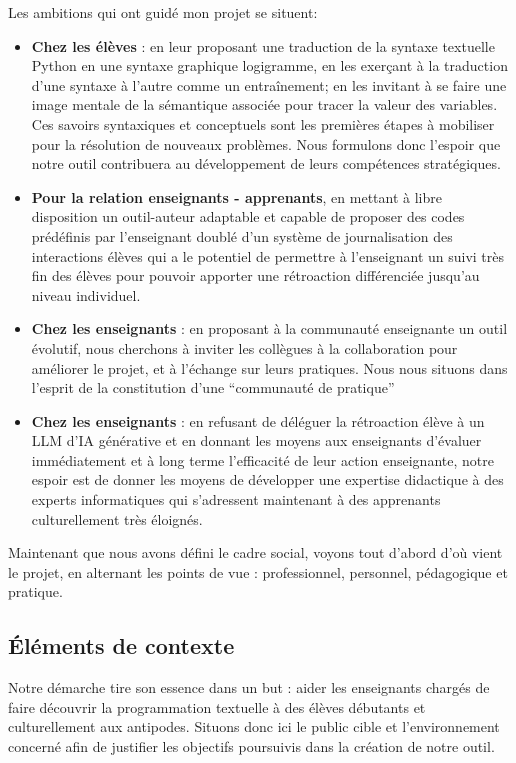 \documentclass[11pt,a4paper]{article}
\begin{document}
\par Les ambitions qui ont guidé mon projet se situent:
\begin{itemize}
    \item \textbf{Chez les élèves} : en leur proposant une traduction de la syntaxe textuelle Python en une syntaxe graphique logigramme, en les exerçant à la traduction d'une syntaxe à l'autre comme un entraînement; en les invitant à se faire une image mentale de la sémantique associée pour tracer la valeur des variables. Ces savoirs syntaxiques et conceptuels sont les premières étapes à mobiliser pour la résolution de nouveaux problèmes. Nous formulons donc l'espoir que notre outil contribuera au développement de leurs compétences stratégiques.
    \item \textbf{Pour la relation enseignants - apprenants}, en mettant à libre disposition un outil-auteur adaptable et capable de proposer des codes prédéfinis par l'enseignant doublé d'un système de journalisation des interactions élèves qui a le potentiel de permettre à l'enseignant un suivi très fin des élèves pour pouvoir apporter une rétroaction différenciée jusqu'au niveau individuel.
    \item \textbf{Chez les enseignants} : en proposant à la communauté enseignante un outil évolutif, nous cherchons à inviter les collègues à la collaboration pour améliorer le projet, et à l'échange sur leurs pratiques. Nous nous situons dans l'esprit de la constitution d'une ``communauté de pratique'' \cite{wenger} \item \textbf{Chez les enseignants} : en refusant de déléguer la rétroaction élève à un LLM d'IA générative et en donnant les moyens aux enseignants d'évaluer immédiatement et à long terme l'efficacité de leur action enseignante, notre espoir est de donner les moyens de développer une expertise didactique à des experts informatiques qui s'adressent maintenant à des apprenants culturellement très éloignés.
\end{itemize}
Maintenant que nous avons défini le cadre social, voyons tout d'abord d'où vient le projet, en alternant les points de vue : professionnel, personnel, pédagogique et pratique.

\subsection{Éléments de contexte}
Notre démarche tire son essence dans un but : aider les enseignants chargés de faire découvrir la programmation textuelle à des élèves débutants et culturellement aux antipodes. Situons donc ici le public cible et l'environnement concerné afin de justifier les objectifs poursuivis dans la création de notre outil. 
\end{document}
